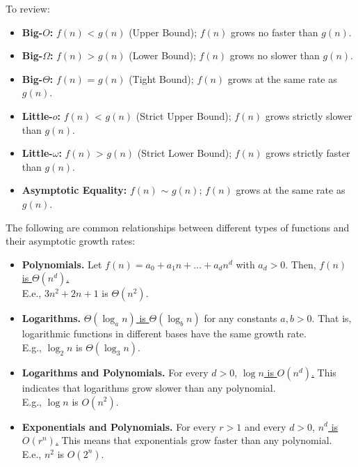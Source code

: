 \begin{Tip}
    To review:
    \begin{itemize}
        \item \textbf{Big-$O$:} $f(n)$ < $g(n)$ (Upper Bound); $f(n)$ grows no faster than $g(n)$.
        \item \textbf{Big-$\Omega$:} $f(n)$ > $g(n)$ (Lower Bound); $f(n)$ grows no slower than $g(n)$.
        \item \textbf{Big-$\Theta$:} $f(n)$ = $g(n)$ (Tight Bound); $f(n)$ grows at the same rate as $g(n)$.
        \item \textbf{Little-$o$:} $f(n)$ < $g(n)$ (Strict Upper Bound); $f(n)$ grows strictly slower than $g(n)$.
        \item \textbf{Little-$\omega$:} $f(n)$ > $g(n)$ (Strict Lower Bound); $f(n)$ grows strictly faster than $g(n)$.
        \item \textbf{Asymptotic Equality:} $f(n)$ $\sim$ $g(n)$; $f(n)$ grows at the same rate as $g(n)$.
    \end{itemize}
\end{Tip}

\begin{theo}

    The following are common relationships between different types of functions and their asymptotic growth rates:

    \begin{itemize}
        \item \textbf{Polynomials.} Let $f(n) = a_0 + a_1 n + \dots + a_d n^d$ with $a_d > 0$. Then, \underline{$f(n)$ is $\Theta(n^d)$.}\\
        E.e., $3n^2+2n+1$ is $\Theta(n^2)$.
        
        \item \textbf{Logarithms.} \underline{$\Theta(\log_a n)$ is $\Theta(\log_b n)$} for any constants $a, b > 0$. That is, logarithmic functions in different bases have the same growth rate.\\
        E.g., $\log_2 n$ is $\Theta(\log_3 n)$.
        
        \item \textbf{Logarithms and Polynomials.} For every $d > 0$, \underline{$\log n$ is $O(n^d)$.} This indicates that logarithms grow slower than any polynomial.\\
        E.g., $\log n$ is $O(n^2)$.
        
        \item \textbf{Exponentials and Polynomials.} For every $r > 1$ and every $d > 0$, \underline{$n^d$ is $O(r^n)$.} This means that exponentials grow faster than any polynomial.\\
        E.e., $n^2$ is $O(2^n)$.
    \end{itemize}
\end{theo}


